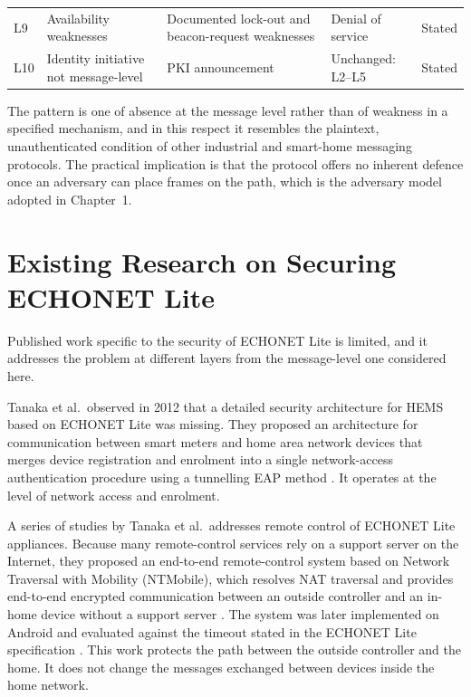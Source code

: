 \begin{table}[htbp]
\begin{tabularx}{\textwidth}{@{}l >{\raggedright\arraybackslash}p{3.3cm} >{\raggedright\arraybackslash}X >{\raggedright\arraybackslash}p{2.9cm} l@{}}
    L9          & Availability weaknesses                        & Documented lock-out and beacon-request weaknesses \cite{ECHONETGuidelines}                & Denial of service                        & Stated              \\
    L10         & Identity initiative not message-level          & PKI announcement \cite{SEALSQ2026}                                                        & Unchanged: L2--L5                        & Stated              \\
    \bottomrule
  \end{tabularx}
\end{table}

The pattern is one of absence at the message level rather than of weakness in a specified mechanism, and in this respect it resembles the plaintext, unauthenticated condition of other industrial and smart-home messaging protocols. The practical implication is that the protocol offers no inherent defence once an adversary can place frames on the path, which is the adversary model adopted in Chapter~1.

\section{Existing Research on Securing ECHONET Lite}
\label{sec:related-echonet}

Published work specific to the security of ECHONET Lite is limited, and it addresses the problem at different layers from the message-level one considered here.

Tanaka et al.\ observed in 2012 that a detailed security architecture for HEMS based on ECHONET Lite was missing. They proposed an architecture for communication between smart meters and home area network devices that merges device registration and enrolment into a single network-access authentication procedure using a tunnelling EAP method \cite{Tanaka2012}. It operates at the level of network access and enrolment.

A series of studies by Tanaka et al.\ addresses remote control of ECHONET Lite appliances. Because many remote-control services rely on a support server on the Internet, they proposed an end-to-end remote-control system based on Network Traversal with Mobility (NTMobile), which resolves NAT traversal and provides end-to-end encrypted communication between an outside controller and an in-home device without a support server \cite{TanakaGCCE2017,tanakaEvaluationSecureEndtoend2018}. The system was later implemented on Android and evaluated against the timeout stated in the ECHONET Lite specification \cite{TanakaICCE2019}. This work protects the path between the outside controller and the home. It does not change the messages exchanged between devices inside the home network.

